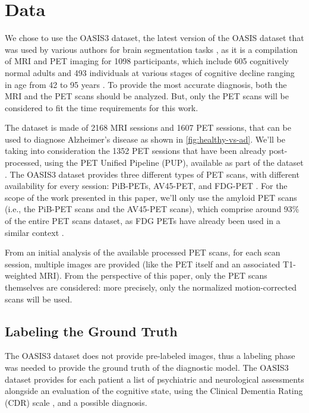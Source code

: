 \documentclass[10pt,twocolumn,letterpaper]{article}
\begin{document}
\section{Data}
\label{sec:data}

We chose to use the OASIS3 dataset, the latest version of the OASIS dataset that
was used by various authors for brain segmentation tasks \cite{Dalca2019,
  Huo2018, Huo2019, Rebsamen2020}, as it is a compilation of MRI and PET imaging
for 1098 participants, which include 605 cognitively normal adults and 493
individuals at various stages of cognitive decline ranging in age from 42 to 95
years \cite{LaMontagne2019}. To provide the most accurate diagnosis, both the
MRI and the PET scans should be analyzed. But, only the PET scans will be
considered to fit the time requirements for this work.

The dataset is made of 2168 MRI sessions and 1607 PET sessions, that can be used
to diagnose Alzheimer's disease as shown in \cref{fig:healthy-vs-ad}. We'll be
taking into consideration the 1352 PET sessions that have been already
post-processed, using the PET Unified Pipeline (PUP), available as part of the
dataset \cite{LaMontagne2019}. The OASIS3 dataset provides three different types
of PET scans, with different availability for every session: PiB-PETs, AV45-PET,
and FDG-PET \cite{LaMontagne2019}. For the scope of the work presented in this
paper, we'll only use the amyloid PET scans (i.e., the PiB-PET scans and the
AV45-PET scans), which comprise around 93\% of the entire PET scans dataset, as
FDG PETs have already been used in a similar context \cite{Singh2017}.

From an initial analysis of the available processed PET scans, for each scan
session, multiple images are provided (like the PET itself and an associated
T1-weighted MRI). From the perspective of this paper, only the PET scans
themselves are considered: more precisely, only the normalized motion-corrected
scans will be used.

\subsection{Labeling the Ground Truth}
\label{sec:labeling-ground-truth}

The OASIS3 dataset does not provide pre-labeled images, thus a labeling phase
was needed to provide the ground truth of the diagnostic model. The OASIS3
dataset provides for each patient a list of psychiatric and neurological
assessments alongside an evaluation of the cognitive state, using the Clinical
Dementia Rating (CDR) scale \cite{Morris1997}, and a possible diagnosis.
\end{document}
